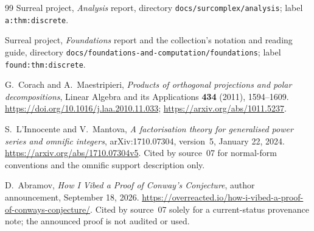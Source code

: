 \documentclass[11pt,letterpaper]{article}
\numberwithin{equation}{section}
\theoremstyle{definition}
\theoremstyle{remark}
\newcommand{\replabel}[1]{\nolinkurl{#1}}
\newcommand{\fn}[1]{\nolinkurl{#1}}
\begin{document}
\begin{thebibliography}{99}
Surreal project, \emph{Analysis} report, directory
\fn{docs/surcomplex/analysis}; label \replabel{a:thm:discrete}.

Surreal project, \emph{Foundations} report and the collection's notation and
reading guide, directory \fn{docs/foundations-and-computation/foundations};
label \replabel{found:thm:discrete}.

G.~Corach and A.~Maestripieri,
\emph{Products of orthogonal projections and polar decompositions},
Linear Algebra and its Applications \textbf{434} (2011), 1594--1609.
\url{https://doi.org/10.1016/j.laa.2010.11.033};
\url{https://arxiv.org/abs/1011.5237}.

S.~L'Innocente and V.~Mantova,
\emph{A factorisation theory for generalised power series and omnific
integers}, arXiv:1710.07304, version~5, January 22, 2024.
\url{https://arxiv.org/abs/1710.07304v5}. Cited by source~07 for normal-form
conventions and the omnific support description only.

D.~Abramov, \emph{How I Vibed a Proof of Conway's Conjecture}, author
announcement, September 18, 2026.
\url{https://overreacted.io/how-i-vibed-a-proof-of-conways-conjecture/}.
Cited by source~07 solely for a current-status provenance note; the announced
proof is not audited or used.

\end{thebibliography}
\end{document}
